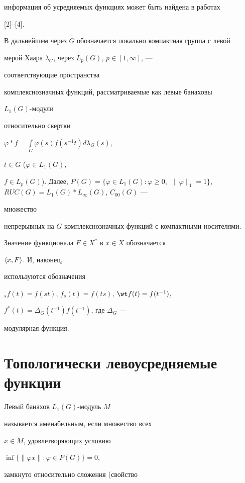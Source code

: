 информация об усредняемых функциях может быть найдена в работах


[2]--[4].





В дальнейшем через $G$ обозначается локально компактная группа с левой


мерой Хаара $\lambda_G$, через $L_p(G)$, $p\in [1,\infty]$, ---


соответствующие пространства


комплекснозначных функций, рассматриваемые как левые банаховы


$L_1(G)$-модули


относительно свертки


$\varphi\ast f=\int\limits_G\varphi(s)f(s^{-1}t)d\lambda_G(s)$,


$t\in G$ ($\varphi\in L_1(G)$,


$f\in L_p(G)$). Далее, $P(G)=\{\varphi\in L_1(G):\varphi\ge 0,\ \;


\|\varphi\|_1=1\}$, $RUC(G)=L_1(G)\ast L_\infty(G)$, $C_{00}(G)$ ---


множество


непрерывных на $G$ комплекснозначных функций с компактными носителями.


Значение функционала $F\in X^*$ в $x\in X$ обозначается


$\langle x,F\rangle$. И, наконец,


используются обозначения


${}_sf(t)=f(st)$, $f_s(t)=f(ts)$, $\wt f(t)=f(t^{-1})$,


$f^*(t)=\Delta_G(t^{-1})f(t^{-1})$, где $\Delta_G$ ---


модулярная функция.





\section{Топологически левоусредняемые функции}





Левый банахов $L_1(G)$-модуль $M$


называется аменабельным, если множество всех


$x\in M$, удовлетворяющих условию


$\inf\{\|\varphi x\|:\varphi\in P(G)\}=0$,


замкнуто относительно сложения (свойство


